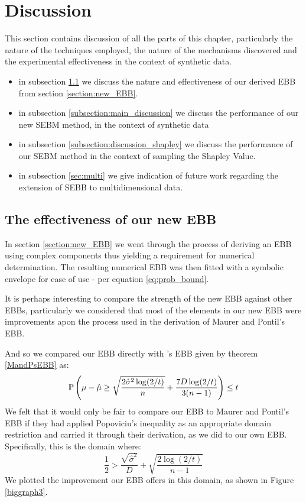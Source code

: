 
\section{Discussion}
\label{sec:discussion}

This section contains discussion of all the parts of this chapter, particularly the nature of the techniques employed, the nature of the mechanisms discovered and the experimental effectiveness in the context of synthetic data.
\begin{itemize}
\item	in subsection \ref{subsection:discussion_EBB} we discuss the nature and effectiveness of our derived EBB from section \ref{section:new_EBB}.
\item	in subsection \ref{subsection:main_discussion} we discuss the performance of our new SEBM method, in the context of synthetic data
\item	in subsection \ref{subsection:discussion_shapley} we discuss the performance of our SEBM method in the context of sampling the Shapley Value.
\item	in subsection \ref{sec:multi} we give indication of future work regarding the extension of SEBB to multidimensional data.
\end{itemize}



\subsection{The effectiveness of our new EBB}\label{subsection:discussion_EBB}

In section \ref{section:new_EBB} we went through the process of deriving an EBB using complex components thus yielding a requirement for numerical determination.
The resulting numerical EBB was then fitted with a symbolic envelope for ease of use - per equation \ref{eq:prob_bound}.

It is perhaps interesting to compare the strength of the new EBB against other EBBs, particularly we considered that most of the elements in our new EBB were improvements apon the process used in the derivation of Maurer and Pontil's EBB.

And so we compared our EBB directly with \cite{Maurer50empiricalbernstein}'s EBB given by theorem \ref{MandPsEBB} as:
$$\operatorname{\mathbb{P}}\left(\mu-\hat{\mu}\ge\sqrt{\frac{2\hat{\sigma}^2\log(2/t)}{n}}+\frac{7D\log(2/t)}{3(n-1)}\right)\le t$$
We felt that it would only be fair to compare our EBB to Maurer and Pontil's EBB if they had applied Popoviciu's inequality as an appropriate domain restriction and carried it through their derivation, as we did to our own EBB. 
Specifically, this is the domain where:
\[ \frac{1}{2}>\frac{\sqrt{\hat{\sigma}^2}}{D}+\sqrt{\frac{2\log(2/t)}{n-1}} \]
We plotted the improvement our EBB offers in this domain, as shown in Figure \ref{biggraph3}. 

